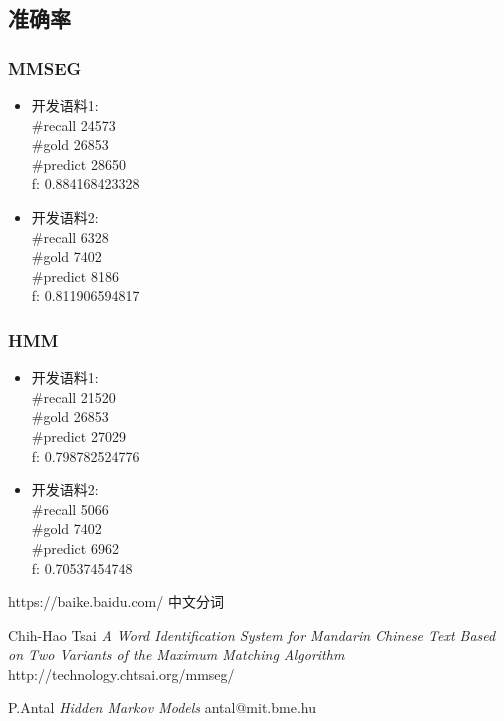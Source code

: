 \documentclass[titlepage]{article}
\begin{document}
\subsection{准确率}
\subsubsection{MMSEG}
\begin{itemize}
    \item 开发语料1:\\[1em]
        \#recall 24573\\
        \#gold 26853\\
        \#predict 28650\\
        f: 0.884168423328
    \item 开发语料2:\\[1em]
        \#recall 6328\\
        \#gold 7402\\
        \#predict 8186\\
        f: 0.811906594817
\end{itemize}
\subsubsection{HMM}
\begin{itemize}
    \item 开发语料1:\\[1em]
        \#recall 21520\\
        \#gold 26853\\
        \#predict 27029\\
        f: 0.798782524776
    \item 开发语料2:\\[1em]
        \#recall 5066\\
        \#gold 7402\\
        \#predict 6962\\
        f: 0.70537454748
\end{itemize}
\begin{thebibliography}{1}

     https://baike.baidu.com/ 中文分词

     Chih-Hao Tsai \textit{A Word Identification System for Mandarin Chinese Text Based on Two Variants of the Maximum Matching Algorithm} http://technology.chtsai.org/mmseg/ 

     P.Antal \textit{Hidden Markov Models} antal@mit.bme.hu

\end{thebibliography}
\end{document}
